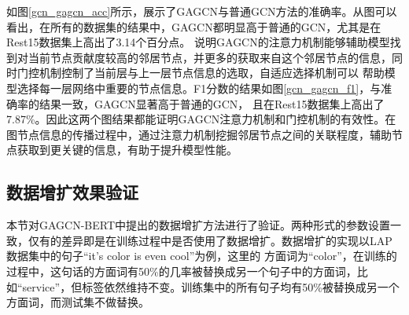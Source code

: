 如图\ref{gcn_gagcn_acc}所示，展示了GAGCN与普通GCN方法的准确率。从图可以看出，在所有的数据集的结果中，GAGCN都明显高于普通的GCN，尤其是在Rest15数据集上高出了3.14个百分点。
说明GAGCN的注意力机制能够辅助模型找到对当前节点贡献度较高的邻居节点，并更多的获取来自这个邻居节点的信息，同时门控机制控制了当前层与上一层节点信息的选取，自适应选择机制可以
帮助模型选择每一层网络中重要的节点信息。F1分数的结果如图\ref{gcn_gagcn_f1}，与准确率的结果一致，GAGCN显著高于普通的GCN，
且在Rest15数据集上高出了7.87\%。因此这两个图结果都能证明GAGCN注意力机制和门控机制的有效性。在图节点信息的传播过程中，通过注意力机制挖掘邻居节点之间的关联程度，辅助节点获取到更关键的信息，有助于提升模型性能。

\subsection{数据增扩效果验证}
本节对GAGCN-BERT中提出的数据增扩方法进行了验证。两种形式的参数设置一致，仅有的差异即是在训练过程中是否使用了数据增扩。数据增扩的实现以LAP数据集中的句子“it's color is even cool”为例，这里的
方面词为“color”，在训练的过程中，这句话的方面词有50\%的几率被替换成另一个句子中的方面词，比如“service”，但标签依然维持不变。训练集中的所有句子均有50\%被替换成另一个方面词，而测试集不做替换。

